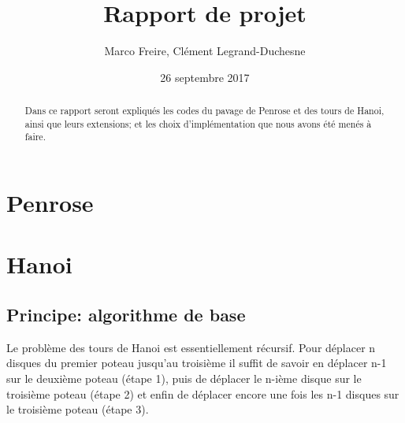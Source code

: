 \documentclass[a4paper, 11pt]{article}%
\begin{document}
\title{Rapport de projet}

\author{Marco Freire, Clément Legrand-Duchesne}

\date{26 septembre 2017}

\maketitle

\begin{abstract}
  Dans ce rapport seront expliqués les codes du pavage de Penrose et des
  tours de Hanoi, ainsi que leurs extensions; et les choix d'implémentation
  que nous avons été menés à faire.
\end{abstract}


\section{Penrose}

\section{Hanoi}

	\subsection{Principe: algorithme de base}
		Le problème des tours de Hanoi est essentiellement récursif. Pour
		déplacer n disques du premier poteau jusqu'au troisième
		il suffit de savoir en déplacer n-1 sur le deuxième poteau (étape 1), puis
		de déplacer le n-ième disque sur le troisième poteau (étape 2) et enfin de
		déplacer encore une fois les n-1 disques sur le troisième poteau (étape 3).
\end{document}
